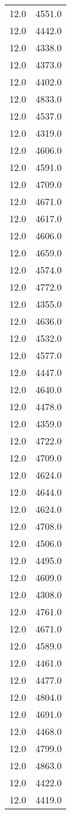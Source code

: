 \begin{table}
\begin{tabular}{S[]}
12.0 & 4551.0\\
12.0 & 4442.0\\
12.0 & 4338.0\\
12.0 & 4373.0\\
12.0 & 4402.0\\
12.0 & 4833.0\\
12.0 & 4537.0\\
12.0 & 4319.0\\
12.0 & 4606.0\\
12.0 & 4591.0\\
12.0 & 4709.0\\
12.0 & 4671.0\\
12.0 & 4617.0\\
12.0 & 4606.0\\
12.0 & 4659.0\\
12.0 & 4574.0\\
12.0 & 4772.0\\
12.0 & 4355.0\\
12.0 & 4636.0\\
12.0 & 4532.0\\
12.0 & 4577.0\\
12.0 & 4447.0\\
12.0 & 4640.0\\
12.0 & 4478.0\\
12.0 & 4359.0\\
12.0 & 4722.0\\
12.0 & 4709.0\\
12.0 & 4624.0\\
12.0 & 4644.0\\
12.0 & 4624.0\\
12.0 & 4708.0\\
12.0 & 4506.0\\
12.0 & 4495.0\\
12.0 & 4609.0\\
12.0 & 4308.0\\
12.0 & 4761.0\\
12.0 & 4671.0\\
12.0 & 4589.0\\
12.0 & 4461.0\\
12.0 & 4477.0\\
12.0 & 4804.0\\
12.0 & 4691.0\\
12.0 & 4468.0\\
12.0 & 4799.0\\
12.0 & 4863.0\\
12.0 & 4422.0\\
12.0 & 4419.0\\

\end{tabular}
\end{table}
